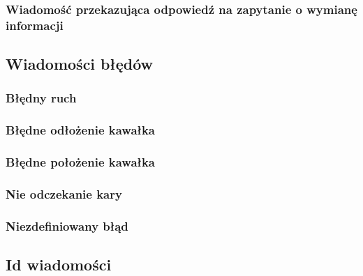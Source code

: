 \documentclass[Dokumentacja.tex]{subfiles}
\begin{document}
\subsubsection{Wiadomość przekazująca odpowiedź na zapytanie o wymianę informacji}


\subsection{Wiadomości błędów}

\subsubsection{Błędny ruch}


\subsubsection{Błędne odłożenie kawałka}


\subsubsection{Błędne położenie kawałka}


\subsubsection{Nie odczekanie kary}


\subsubsection{Niezdefiniowany błąd}


\subsection{Id wiadomości}
\end{document}
